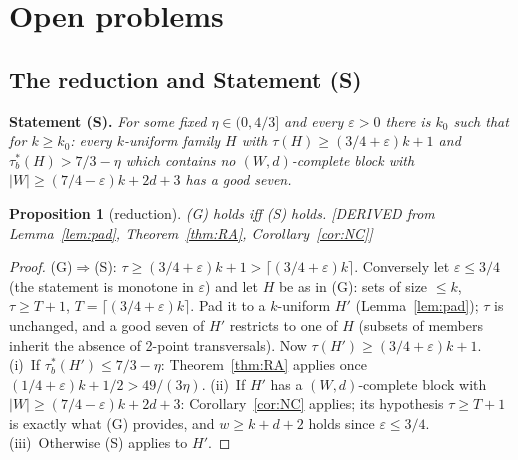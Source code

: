 \documentclass[11pt]{article}
\newtheorem{proposition}[theorem]{Proposition}
\theoremstyle{definition}
\newcommand{\st}[1]{\textsf{\small[#1]}}
\begin{document}
\section{Open problems}\label{sec:open}

\subsection{The reduction and Statement (S)}

\noindent\textbf{Statement (S).} \emph{For some fixed $\eta\in(0,4/3]$ and every $\varepsilon>0$ there is $k_0$ such that
for $k\ge k_0$: every $k$-uniform family $H$ with $\tau(H)\ge(3/4+\varepsilon)k+1$ and $\tau^*_b(H)>7/3-\eta$ which
contains no $(W,d)$-complete block with $|W|\ge(7/4-\varepsilon)k+2d+3$ has a good seven.}

\begin{proposition}[reduction]\label{prop:S}
(G) holds iff (S) holds. \st{DERIVED from Lemma~\ref{lem:pad}, Theorem~\ref{thm:RA}, Corollary~\ref{cor:NC}}
\end{proposition}
\begin{proof}
(G)$\Rightarrow$(S): $\tau\ge(3/4+\varepsilon)k+1>\lceil(3/4+\varepsilon)k\rceil$. Conversely let $\varepsilon\le3/4$
(the statement is monotone in $\varepsilon$) and let $H$ be as in (G): sets of size $\le k$,
$\tau\ge T+1$, $T=\lceil(3/4+\varepsilon)k\rceil$. Pad it to a $k$-uniform $H'$ (Lemma~\ref{lem:pad}); $\tau$ is
unchanged, and a good seven of $H'$ restricts to one of $H$ (subsets of members inherit the absence of 2-point
transversals). Now $\tau(H')\ge(3/4+\varepsilon)k+1$. (i)~If $\tau^*_b(H')\le7/3-\eta$: Theorem~\ref{thm:RA} applies
once $(1/4+\varepsilon)k+1/2>49/(3\eta)$. (ii)~If $H'$ has a $(W,d)$-complete block with $|W|\ge(7/4-\varepsilon)k+2d+3$:
Corollary~\ref{cor:NC} applies; its hypothesis $\tau\ge T+1$ is exactly what (G) provides, and $w\ge k+d+2$ holds since
$\varepsilon\le3/4$. (iii)~Otherwise (S) applies to $H'$.
\end{proof}
\end{document}
